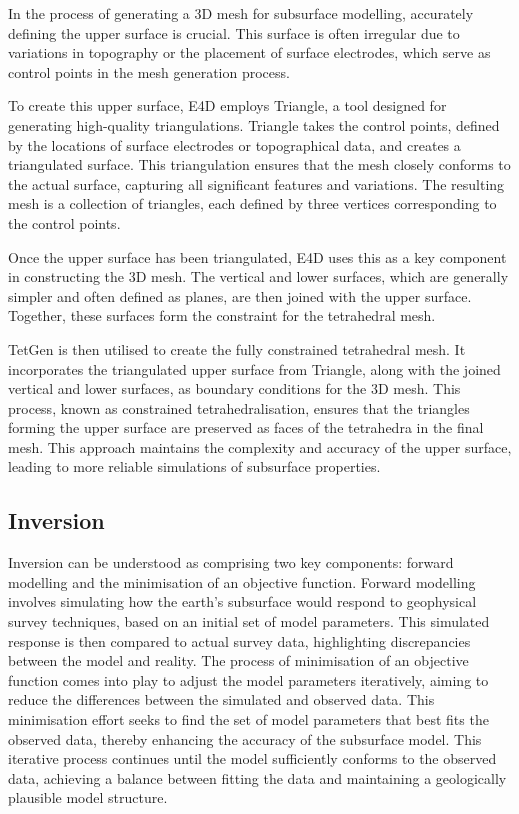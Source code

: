 \documentclass[a4paper,12pt]{article}
\begin{document}
In the process of generating a 3D mesh for subsurface modelling, accurately defining the upper surface is crucial. This surface is often irregular due to variations in topography or the placement of surface electrodes, which serve as control points in the mesh generation process.

To create this upper surface, E4D employs Triangle, a tool designed for generating high-quality triangulations. Triangle takes the control points, defined by the locations of surface electrodes or topographical data, and creates a triangulated surface. This triangulation ensures that the mesh closely conforms to the actual surface, capturing all significant features and variations. The resulting mesh is a collection of triangles, each defined by three vertices corresponding to the control points.

Once the upper surface has been triangulated, E4D uses this as a key component in constructing the 3D mesh. The vertical and lower surfaces, which are generally simpler and often defined as planes, are then joined with the upper surface. Together, these surfaces form the constraint for the tetrahedral mesh.

TetGen is then utilised to create the fully constrained tetrahedral mesh. It incorporates the triangulated upper surface from Triangle, along with the joined vertical and lower surfaces, as boundary conditions for the 3D mesh. This process, known as constrained tetrahedralisation, ensures that the triangles forming the upper surface are preserved as faces of the tetrahedra in the final mesh. This approach maintains the complexity and accuracy of the upper surface, leading to more reliable simulations of subsurface properties.


\subsection{Inversion}

Inversion can be understood as comprising two key components: forward modelling and the minimisation of an objective function. Forward modelling involves simulating how the earth's subsurface would respond to geophysical survey techniques, based on an initial set of model parameters. This simulated response is then compared to actual survey data, highlighting discrepancies between the model and reality. The process of minimisation of an objective function comes into play to adjust the model parameters iteratively, aiming to reduce the differences between the simulated and observed data. This minimisation effort seeks to find the set of model parameters that best fits the observed data, thereby enhancing the accuracy of the subsurface model. This iterative process continues until the model sufficiently conforms to the observed data, achieving a balance between fitting the data and maintaining a geologically plausible model structure.
\end{document}
